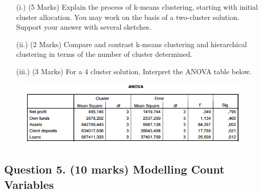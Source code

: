 \documentclass[a4paper,12pt]{article}
\begin{document}
\begin{itemize}
	\item[(i.)] (5 Marks) Explain the process of k-means clustering, starting with initial cluster allocation. You may work on the basis of a two-cluster solution. Support your answer with several sketches.
	\item[(ii.)] (2 Marks) Compare and contrast k-means clustering and hierarchical clustering in terms of the number of cluster determined.
	\item[(iii.)] (3 Marks) For a 4 cluster solution, Interpret the ANOVA table below.
\end{itemize}


\begin{figure}[h!]
\centering
\includegraphics[width=1.1\linewidth]{ANOVA}
\end{figure}


\newpage

\subsection*{Question 5. (10 marks) Modelling Count Variables }
\end{document}
